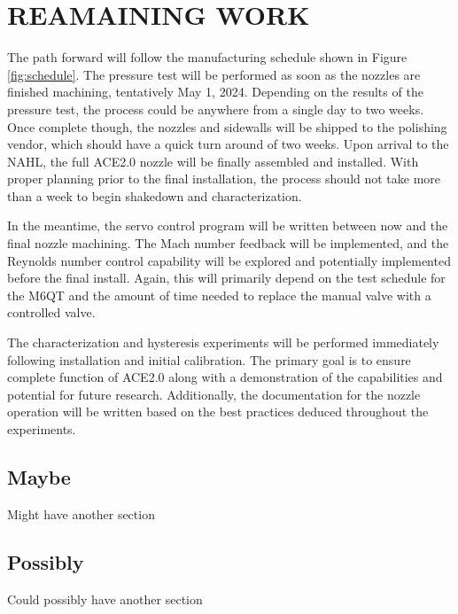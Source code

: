 %
%  
%

\chapter{REAMAINING WORK}

The path forward will follow the manufacturing schedule shown in Figure \ref{fig:schedule}. The pressure test will be performed as soon as the nozzles are finished machining, tentatively May 1, 2024. Depending on the results of the pressure test, the process could be anywhere from a single day to two weeks. Once complete though, the nozzles and sidewalls will be shipped to the polishing vendor, which should have a quick turn around of two weeks. Upon arrival to the NAHL, the full ACE2.0 nozzle will be finally assembled and installed. With proper planning prior to the final installation, the process should not take more than a week to begin shakedown and characterization.

In the meantime, the servo control program will be written between now and the final nozzle machining. The Mach number feedback will be implemented, and the Reynolds number control capability will be explored and potentially implemented before the final install. Again, this will primarily depend on the test schedule for the M6QT and the amount of time needed to replace the manual valve with a controlled valve. 

The characterization and hysteresis experiments will be performed immediately following installation and initial calibration. The primary goal is to ensure complete function of ACE2.0 along with a demonstration of the capabilities and potential for future research. Additionally, the documentation for the nozzle operation will be written based on the best practices deduced throughout the experiments.

\section{Maybe}

Might have another section

\section{Possibly}

Could possibly have another section


\nocite{anderson-fundamentals}
\nocite{anderson-compressible}
